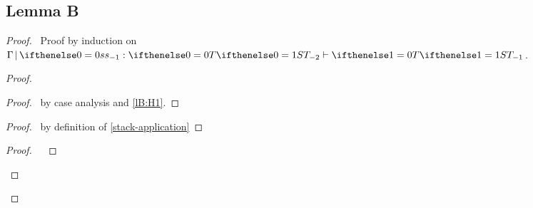 \documentclass[a4paper]{article}
\begin{document}
\subsection{Lemma B}
\begin{proof}
    \assume{
        \begin{enumerate}
        \item $\judge \aContext \aTerm {\aType}$ \label{lB:H1}
        \item $\frameJudge{\aContext}{\aStack}{\aType}{\aType[1]}$ \label{lB:H2}
        \end{enumerate}}
    \prove{$\judge \aContext {\stackapp \aStack \aTerm} {\aType[1]}$}
    \pfsketch\ Proof by induction on $\frameJudge{\aContext}{\aStack}{\aType}{\aType[1]}$.
    \begin{proof}
        \begin{proof}
            \pf\ by case analysis and \ref{lB:H1}.
        \end{proof}
        \begin{proof}
            \pf\ by definition of \ref{stack-application}
        \end{proof}
        \qedstep
        \begin{proof}
            \pf\ 
                        {\judge {\aContext}
                            {\stackapp{\emptyStack}{\aTerm}}
                            {\aType}}
                        {}
        \end{proof}
    \end{proof}


\end{proof}
\end{document}
